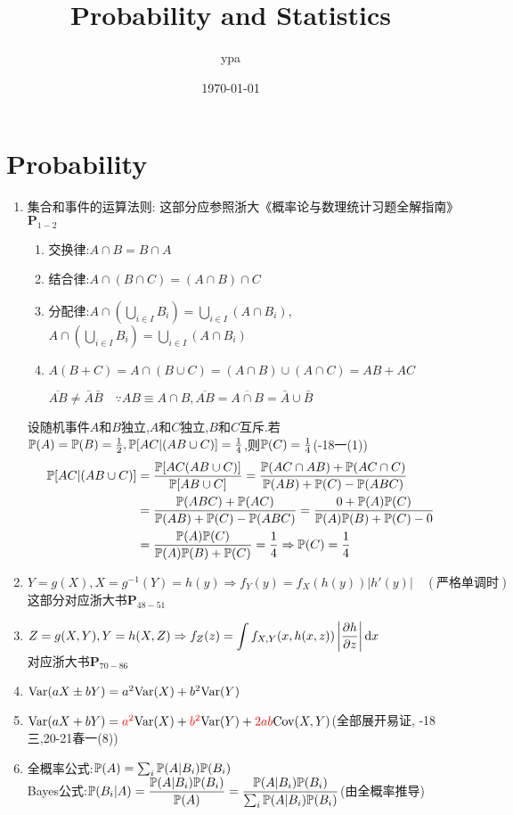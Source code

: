 \documentclass{article}
\title{Probability and Statistics}
\author{ypa}
\date{\today}
\begin{document}
\maketitle
\tableofcontents

\section{Probability}
\begin{enumerate}[label=(\arabic*)]
	\item 集合和事件的运算法则:
				这部分应参照浙大《概率论与数理统计习题全解指南》$\mathbf{P}_{1-2}$
				\begin{enumerate}[label=(\alph*)]
					\item 交换律:$A\cap B = B\cap A$
					\item {\red 结合律}:$A\cap (B\cap C) = (A\cap B)\cap C$
					\item {\red 分配律}:$A\cap (\bigcup\limits_{i\in I} B_i) = \bigcup\limits_{i\in I}(A\cap B_i)$, $A\cap (\bigcup\limits_{i\in I} B_i) = \bigcup\limits_{i\in I}(A\cap B_i)$
					\item $A(B+C)=A\cap (B\cup C) = (A\cap B)\cup (A\cap C) = AB+AC$
					\begin{remark}
						$\overline{AB}\neq \bar{A}\bar{B}\quad \because AB\equiv A\cap B,\overline{AB}=\overline{A\cap B}=\bar{A}\cup \bar{B}$
					\end{remark}
				\end{enumerate}
				\begin{example}
					设随机事件$A$和$B$独立,$A$和$C$独立,$B$和$C$互斥.若$\P(A)=\P(B)=\frac{1}{2},\P[AC|(AB\cup C)]=\frac{1}{4}$,则$\P(C)=\frac{1}{4}$\quad ({-18一(1)})
					\[\begin{aligned}
						\P[AC|(AB\cup C)] &= \frac{\P[AC(AB\cup C)]}{\P[AB\cup C]} = \frac{\P(AC\cap AB)+\P(AC\cap C)}{\P(AB)+\P(C)-\P(ABC)}\\
						&= \frac{\P(ABC)+\P(AC)}{\P(AB)+\P(C)-\P(ABC)} = \frac{0+\P(A)\P(C)}{\P(A)\P(B)+\P(C)-0}\\
						&= \frac{\P(A)\P(C)}{\P(A)\P(B)+\P(C)} = \frac{1}{4} \Rightarrow \P(C) = \frac{1}{4}
					\end{aligned}\]
				\end{example}
	\item $Y=g(X),X=g^{-1}(Y)=h(y)\Rightarrow f_{Y}(y)=f_{X}(h(y))|h'(y)|\quad (\text{严格单调时})$\\
				这部分对应浙大书$\mathbf{P}_{48-51}$
	\item $\displaystyle Z=g(X,Y),Y=h(X,Z)\Rightarrow f_{Z}(z)=\int f_{X,Y}(x,h(x,z))\left|\frac{\partial h}{\partial z}\right|\dif x$\\
				对应浙大书$\mathbf{P}_{70-86}$
	\item $\var(aX\pm bY) = a^2\var(X)+b^2\var(Y)$
	\item $\var(aX+bY) = {\red a^2}\var(X)+{\red b^2}\var(Y)+{\red 2ab}\cov(X,Y)$\quad (全部展开易证, {-18三,20-21春一(8)})
	\item 全概率公式:$\P(A)=\sum_i\P(A|B_i)\P(B_i)$\\
				Bayes公式:$\displaystyle \P(B_i|A) = \frac{\P(A|B_i)\P(B_i)}{\P(A)}=\frac{\P(A|B_i)\P(B_i)}{\sum_i\P(A|B_i)\P(B_i)}$\quad (由全概率推导)
\end{enumerate}
\end{document}
